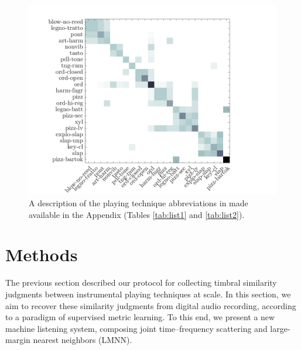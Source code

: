 \documentclass{bmcart}
\newcommand{\nmu}{}
\begin{document}
\begin{figure}
\center
\includegraphics[width = \textwidth]{figures/consensusVsPt.png}
\caption{A description of the playing technique abbreviations in made available in the Appendix (Tables \ref{tab:list1} and \ref{tab:list2}).
}
\label{fig:consensusVsPt}
\end{figure}



\section*{\nmu Methods}
\label{sec:methods}
The previous section described our protocol for collecting timbral similarity judgments between instrumental playing techniques at scale.
In this section, we aim to recover these similarity judgments from digital audio recording, according to a paradigm of supervised metric learning.
To this end, we present a new machine listening system, composing joint time--frequency scattering and large-margin nearest neighbors (LMNN).

\end{document}
